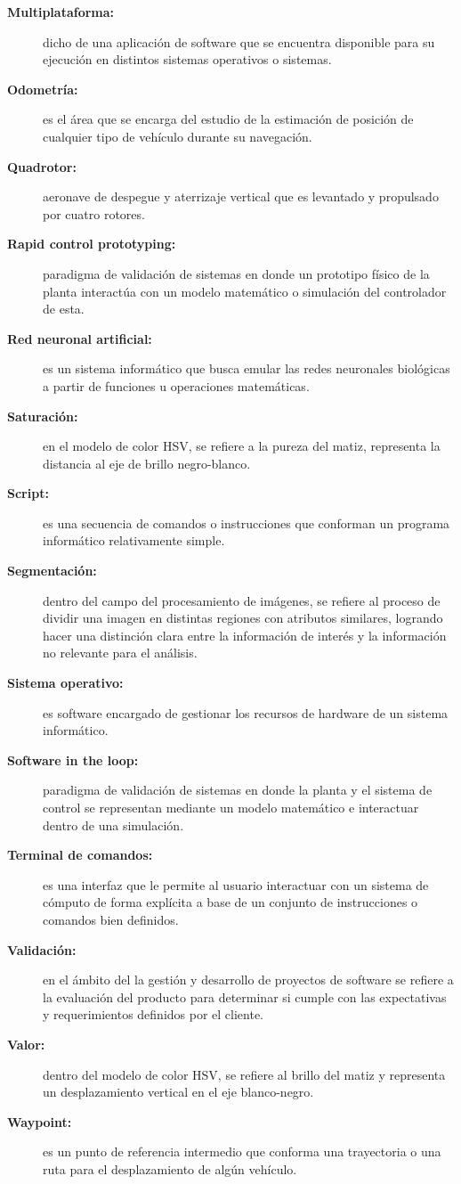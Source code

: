 \begin{description}
  \item[\textbf{Multiplataforma:}] dicho de una aplicación de software que se encuentra disponible para su ejecución en distintos sistemas operativos o sistemas.
  \item[\textbf{Odometría:}] es el área que se encarga del estudio de la estimación de posición de cualquier tipo de vehículo durante su navegación.
  \item[\textbf{Quadrotor:}] aeronave de despegue y aterrizaje vertical que es levantado y propulsado por cuatro rotores.
  \item[\textbf{Rapid control prototyping:}] paradigma de validación de sistemas en donde un prototipo físico de la planta interactúa con un modelo matemático o simulación del controlador de esta.
  \item[\textbf{Red neuronal artificial:}] es un sistema informático que busca emular las redes neuronales biológicas a partir de funciones u operaciones matemáticas.
  \item[\textbf{Saturación:}] en el modelo de color HSV, se refiere a la pureza del matiz, representa la distancia al eje de brillo negro-blanco.
  \item[\textbf{Script:}]  es una secuencia de comandos o instrucciones que conforman un programa informático relativamente simple.
  \item[\textbf{Segmentación:}] dentro del campo del procesamiento de imágenes, se refiere al proceso de dividir una imagen en distintas regiones con atributos similares, logrando hacer una distinción clara entre la información de interés y la información no relevante para el análisis.
  \item[\textbf{Sistema operativo:}] es software encargado de gestionar los recursos de hardware de un sistema informático.
  \item[\textbf{Software in the loop:}] paradigma de validación de sistemas en donde la planta y el sistema de control se representan mediante un modelo matemático e interactuar dentro de una simulación.
  \item[\textbf{Terminal de comandos:}] es una interfaz que le permite al usuario interactuar con un sistema de cómputo de forma explícita a base de un conjunto de instrucciones o comandos bien definidos.
  \item[\textbf{Validación:}] en el ámbito del la gestión y desarrollo de proyectos de software se refiere a la evaluación del producto para determinar si cumple con las expectativas y requerimientos definidos por el cliente.
  \item[\textbf{Valor:}] dentro del modelo de color HSV, se refiere al brillo del matiz y representa un desplazamiento vertical en el eje blanco-negro.
  \item[\textbf{Waypoint:}] es un punto de referencia intermedio que conforma una trayectoria o una ruta para el desplazamiento de algún vehículo.
                        
\end{description}
\clearpage

